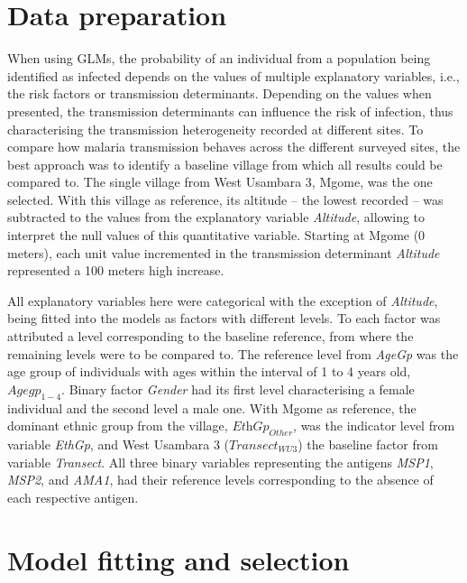 \section{Data preparation} \label{sec:4.1}

When using GLMs, the probability of an individual from a population being identified as infected depends on the values of multiple explanatory variables, i.e., the risk factors or transmission determinants.
Depending on the values when presented, the transmission determinants can influence the risk of infection, thus characterising the transmission heterogeneity recorded at different sites.
To compare how malaria transmission behaves across the different surveyed sites, the best approach was to identify a baseline village from which all results could be compared to.
The single village from West Usambara 3, Mgome, was the one selected.
With this village as reference, its altitude -- the lowest recorded -- was subtracted to the values from the explanatory variable \textit{Altitude}, allowing to interpret the null values of this quantitative variable.
Starting at Mgome (0 meters), each unit value incremented in the transmission determinant \textit{Altitude} represented a 100 meters high increase.


All explanatory variables here were categorical with the exception of \textit{Altitude}, being fitted into the models as factors with different levels.
To each factor was attributed a level corresponding to the baseline reference, from where the remaining levels were to be compared to.
The reference level from \textit{AgeGp} was the age group of individuals with ages within the interval of 1 to 4 years old, $\textit{Agegp}_{1-4}$.
Binary factor \textit{Gender} had its first level characterising a female individual and the second level a male one.
With Mgome as reference, the dominant ethnic group from the village, $\textit{EthGp}_{Other}$, was the indicator level from variable \textit{EthGp}, and West Usambara 3 ($\textit{Transect}_{WU3}$) the baseline factor from variable \textit{Transect}.
All three binary variables representing the antigens \textit{MSP1}, \textit{MSP2}, and \textit{AMA1}, had their reference levels corresponding to the absence of each respective antigen.

\section{Model fitting and selection}

